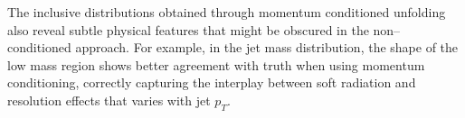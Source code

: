             The inclusive distributions obtained through momentum conditioned unfolding also reveal subtle physical features that might be obscured in the non--conditioned approach.
            For example, in the jet mass distribution, the shape of the low mass region shows better agreement with truth when using momentum conditioning, correctly capturing the interplay between soft radiation and resolution effects that varies with jet \(p_T\).

\begin{figure}
    \centering
    \\

\end{figure}
